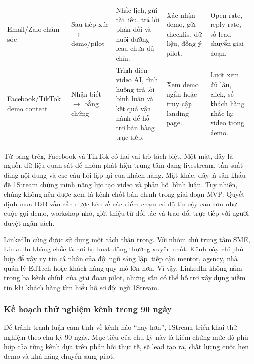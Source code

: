 \begin{table}[H]
\begin{tabularx}{\linewidth}{@{}L{2.9cm}L{2.1cm}Y L{2.9cm}L{3.0cm}@{}}
        Email/Zalo chăm sóc &
        Sau tiếp xúc $\rightarrow$ demo/pilot &
        Nhắc lịch, gửi tài liệu, trả lời phản đối và nuôi dưỡng lead chưa đủ chín. &
        Xác nhận demo, gửi checklist dữ liệu, đồng ý pilot. &
        Open rate, reply rate, số lead chuyển giai đoạn. \\

        Facebook/TikTok demo content &
        Nhận biết $\rightarrow$ bằng chứng &
        Trình diễn video AI, tình huống trả lời bình luận và kết quả vận hành để
        hỗ trợ bán hàng trực tiếp. &
        Xem demo ngắn hoặc truy cập landing page. &
        Lượt xem đủ lâu, click, số khách hàng nhắc lại video trong demo. \\ \bottomrule
    \end{tabularx}
\end{table}

Từ bảng trên, Facebook và TikTok có hai vai trò tách biệt. Một mặt, đây là nguồn
dữ liệu quan sát để nhóm phát hiện trung tâm đang livestream, tần suất đăng nội
dung và các câu hỏi lặp lại của khách hàng. Mặt khác, đây là sân khấu để 1Stream
chứng minh năng lực tạo video và phản hồi bình luận. Tuy nhiên, chúng không nên
được xem là kênh chốt bán chính trong giai đoạn MVP. Quyết định mua B2B vẫn cần
được kéo về các điểm chạm có độ tin cậy cao hơn như cuộc gọi demo, workshop nhỏ,
giới thiệu từ đối tác và trao đổi trực tiếp với người duyệt ngân sách.

LinkedIn cũng được sử dụng một cách thận trọng. Với nhóm chủ trung tâm SME,
LinkedIn không chắc là nơi họ hoạt động thường xuyên nhất. Kênh này chỉ phù hợp
để xây uy tín cá nhân của đội ngũ sáng lập, tiếp cận mentor, agency, nhà quản lý
EdTech hoặc khách hàng quy mô lớn hơn. Vì vậy, LinkedIn không nằm trong ba kênh
chính của giai đoạn pilot, nhưng vẫn có thể hỗ trợ xây dựng niềm tin khi khách
hàng tìm hiểu hồ sơ đội ngũ 1Stream.

\subsubsection{Kế hoạch thử nghiệm kênh trong 90 ngày}

Để tránh tranh luận cảm tính về kênh nào ``hay hơn'', 1Stream triển khai thử
nghiệm theo chu kỳ 90 ngày. Mục tiêu của chu kỳ này là kiểm chứng mức độ phù hợp
của từng kênh dựa trên phản hồi thực tế, số lead tạo ra, chất lượng cuộc hẹn demo
và khả năng chuyển sang pilot.

